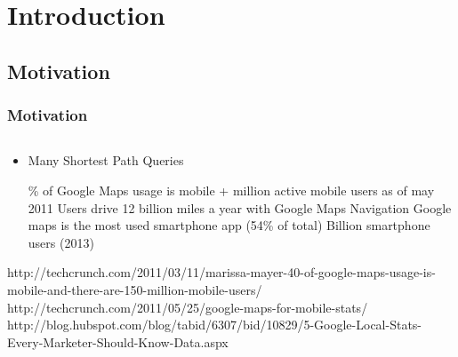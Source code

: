 
\section{Introduction} %


\subsection{Motivation}
\begin{frame}[red] %
\frametitle{Motivation} 
\begin{columns}
  \begin{column}{0.5\textwidth}
    \begin{itemize} \vspace{-1.5em}
      \item Many Shortest Path Queries
      \begin{itemize} 
       \% of Google Maps usage is mobile %
      + million active mobile users as of may 2011
      \gitem Users drive 12 billion miles a year with Google Maps Navigation
      \gitem Google maps is the most used smartphone app (54\% of total)
       Billion smartphone users (2013)
      \end{itemize}
    \end{itemize}
  {
      \tiny \color{lightgray}
       http://techcrunch.com/2011/03/11/marissa-mayer-40-of-google-maps-usage-is-mobile-and-there-are-150-million-mobile-users/ \\
       http://techcrunch.com/2011/05/25/google-maps-for-mobile-stats/ \\
       http://blog.hubspot.com/blog/tabid/6307/bid/10829/5-Google-Local-Stats-Every-Marketer-Should-Know-Data.aspx \\
  }
  \end{column}

\end{columns}
\end{frame}
